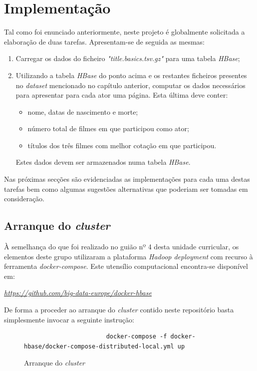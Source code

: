 \documentclass[a4paper]{report}
\begin{document}
\chapter{Implementação} \label{ch:Implementation}
\large {
	Tal como foi enunciado anteriormente, neste projeto é globalmente solicitada a elaboração de duas tarefas. Apresentam-se de seguida as mesmas:
	\begin{enumerate}
		\item Carregar os dados do ficheiro \textit{"title.basics.tsv.gz"} para uma tabela \textit{HBase};
		\item Utilizando a tabela \textit{HBase} do ponto acima e os restantes ficheiros presentes no \textit{dataset} mencionado no capítulo anterior, computar os dados necessários para apresentar para cada ator uma página. Esta última deve conter:
		\begin{itemize}
			\item nome, datas de nascimento e morte;
			\item número total de filmes em que participou como ator;
			\item títulos dos três filmes com melhor cotação em que participou.
		\end{itemize}
		Estes dados devem ser armazenados numa tabela \textit{HBase}.
	\end{enumerate}
	
	Nas próximas secções são evidenciadas as implementações para cada uma destas tarefas bem como algumas sugestões alternativas que poderiam ser tomadas em consideração.
	
	\section{Arranque do \textit{cluster}} \label{sec:Cluster}
		À semelhança do que foi realizado no guião nº 4 desta unidade curricular, os elementos deste grupo utilizaram a plataforma \textit{Hadoop deployment} com recurso à ferramenta \textit{docker-compose}. Este utensílio computacional encontra-se disponível em:
		\begin{center}
			\textit{\url{https://github.com/big-data-europe/docker-hbase}}
		\end{center}
		De forma a proceder ao arranque do \textit{cluster} contido neste repositório basta simplesmente invocar a seguinte instrução:
		\begin{figure}[H]
			{
				\color{teal}
				\begin{verbatim}
				       docker-compose -f docker-hbase/docker-compose-distributed-local.yml up
				\end{verbatim}
			}
			\caption{Arranque do \textit{cluster}}
            \label{fig:1}
		\end{figure}

}
\end{document}
